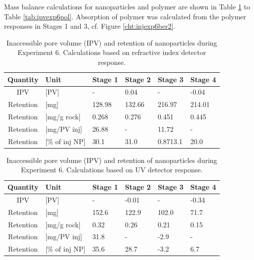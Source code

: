Mass balance calculations for nanoparticles and polymer are shown in Table \ref{tab:ipvexp6} to Table \ref{tab:ipvexp6pol}. Absorption of polymer was calculated from the polymer responses in Stages 1 and 3, cf. Figure \ref{cht:injexp6ber2}. 

\begin{table}[p]
\small
\centering
\caption{Inaccessible pore volume (IPV) and retention of nanoparticles during Experiment 6. Calculations based on refractive index detector response.}
\label{tab:ipvexp6}
\begin{tabular}{c l l l l l } 
\toprule
\textbf{Quantity} & \textbf{Unit} & \textbf{Stage 1} & \textbf{Stage 2} & \textbf{Stage 3} & \textbf{Stage 4} \\ 
\midrule 
IPV         & [PV]          & -         & 0.04     & -         & -0.04     \\
Retention   & [mg]          & 128.98    & 132.66   & 216.97       & 214.01       \\ 
Retention   & [mg/g rock]   & 0.268     & 0.276    & 0.451     & 0.445     \\ 
Retention   & [mg/PV inj]   & 26.88     & -        & 11.72      & -         \\
Retention   & [\% of inj NP]& 30.1      & 31.0     & 0.8713.1       & 20.0       \\ 
\bottomrule
\end{tabular}
\end{table}


\begin{table}[p]
\small
\centering
\caption{Inaccessible pore volume (IPV) and retention of nanoparticles during Experiment 6. Calculations based on UV detector response.}
\label{tab:ipvexp6uv}
\begin{tabular}{c l l l l l } 
\toprule
\textbf{Quantity} & \textbf{Unit} & \textbf{Stage 1} & \textbf{Stage 2} & \textbf{Stage 3} & \textbf{Stage 4} \\ 
\midrule 
IPV         & [PV]          & -         & -0.01     & -         & -0.34     \\
Retention   & [mg]          & 152.6     & 122.9     & 102.0     & 71.7       \\ 
Retention   & [mg/g rock]   & 0.32      & 0.26      & 0.21      & 0.15     \\ 
Retention   & [mg/PV inj]   & 31.8      & -         & -2.9      & -         \\
Retention   & [\% of inj NP]& 35.6      & 28.7      & -3.2      & 6.7       \\ 
\bottomrule
\end{tabular}
\end{table}

